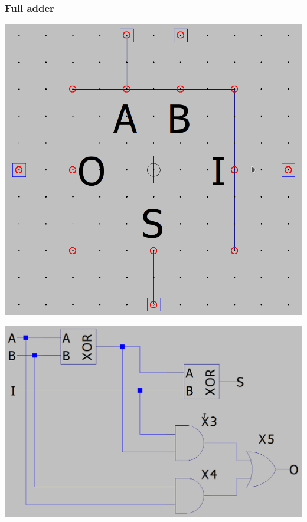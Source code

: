 \documentclass{homeworg}
\begin{document}
\newpage
\subsubsection{Full adder}
    \begin{center}
        \includegraphics[scale=0.5]{fulladder_asy.png}
        
        \includegraphics[scale=0.4]{fulladder_asc.png}
    \end{center}

\newpage
\end{document}

